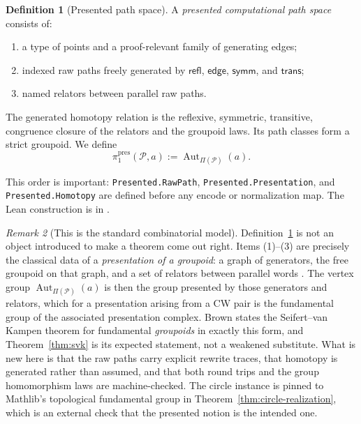\documentclass{lmcs}
\theoremstyle{definition}
\newtheorem{definition}{Definition}[section]
\theoremstyle{plain}
\theoremstyle{remark}
\newtheorem{remark}[definition]{Remark}
\newcommand{\piOne}{\pi_1}
\begin{document}
\begin{definition}[Presented path space]
\label{def:presented}
A \emph{presented computational path space} consists of:
\begin{enumerate}
    \item a type of points and a proof-relevant family of generating edges;
    \item indexed raw paths freely generated by \(\mathsf{refl}\),
    \(\mathsf{edge}\), \(\mathsf{symm}\), and \(\mathsf{trans}\);
    \item named relators between parallel raw paths.
\end{enumerate}
The generated homotopy relation is the reflexive, symmetric, transitive,
congruence closure of the relators and the groupoid laws.  Its path classes form
a strict groupoid.  We define
\[
\piOne^{\mathrm{pres}}(\mathcal P,a)
:=\operatorname{Aut}_{\Pi(\mathcal P)}(a).
\]
\end{definition}

This order is important: \texttt{Presented.RawPath},
\texttt{Presented.Presentation}, and \texttt{Presented.Homotopy} are defined
before any encode or normalization map.  The Lean construction is in
.

\begin{remark}[This is the standard combinatorial model]
\label{rem:presented-standard}
Definition~\ref{def:presented} is not an object introduced to make a theorem
come out right.  Items (1)--(3) are precisely the classical data of a
\emph{presentation of a groupoid}: a graph of generators, the free groupoid on
that graph, and a set of relators between parallel words
\cite{Brown2006,Higgins1971}.  The vertex group
\(\operatorname{Aut}_{\Pi(\mathcal P)}(a)\) is then the group presented by those
generators and relators, which for a presentation arising from a CW pair is the
fundamental group of the associated presentation complex.  Brown states the
Seifert--van Kampen theorem for fundamental \emph{groupoids} in exactly this
form, and Theorem~\ref{thm:svk} is its expected statement, not a weakened
substitute.  What is new here is that the raw paths carry explicit rewrite
traces, that homotopy is generated rather than assumed, and that both round
trips and the group homomorphism laws are machine-checked.  The circle
instance is pinned to Mathlib's topological fundamental group in
Theorem~\ref{thm:circle-realization}, which is an external check that the
presented notion is the intended one.
\end{remark}
\end{document}
